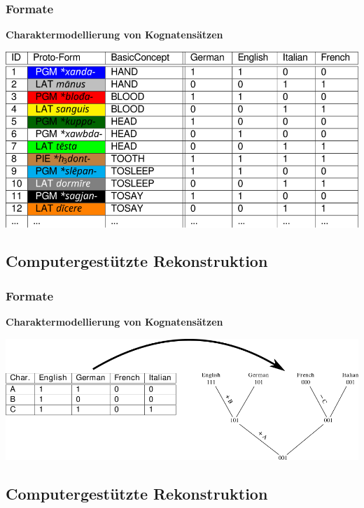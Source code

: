 \subsubsection{\texorpdfstring{{Formate}}{Formate}}

\textbf{Charaktermodellierung von Kognatensätzen}

\href{img/cognates-2.svg}{\includegraphics{img/cognates-2.svg}}

\subsection{\texorpdfstring{{Computergestützte
Rekonstruktion}}{Computergestützte Rekonstruktion}}

\subsubsection{\texorpdfstring{{Formate}}{Formate}}

\textbf{Charaktermodellierung von Kognatensätzen}

\href{img/character-tree.png}{\includegraphics{img/character-tree.png}}

\subsection{\texorpdfstring{{Computergestützte
Rekonstruktion}}{Computergestützte Rekonstruktion}}

